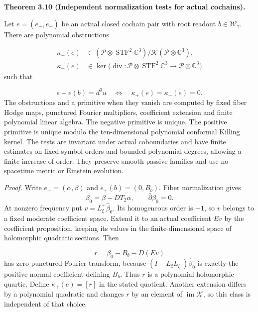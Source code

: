 \documentclass[
  english,
  11pt,
  reqno]{amsart}
\makeatletter
\newcommand{\pandocstatementheading}[1]{%
  \par\addpenalty{\@beginparpenalty}%
  \addvspace{.5\baselineskip plus .2\baselineskip minus .2\baselineskip}%
  {\normalfont\bfseries #1\par}%
  \nobreak\@afterindenttrue\@afterheading
}
\makeatother
\begin{document}
\pandocstatementheading{\leavevmode{}\label{thm:online-actual-cochain-obstruction-test}Theorem 3.10 (Independent normalization tests for actual cochains).}

Let \(e=(e_+,e_-)\) be an actual closed cochain pair with root readout
\(b\in\mathscr W_\gamma\). There are polynomial obstructions

\label{eq:online-actual-polynomial-obstructions} \[
\begin{aligned}
\kappa_+(e)&\in
(\mathcal P\otimes\operatorname{STF}^2\mathbb C^3)
/\mathcal K(\mathcal P\otimes\mathbb C^3),\\
\kappa_-(e)&\in
\ker\bigl(\operatorname{div}:
\mathcal P\otimes\operatorname{STF}^2\mathbb C^3
\longrightarrow\mathcal P\otimes\mathbb C^3\bigr)
\end{aligned}
\] such that

\label{eq:online-actual-normalization-test} \[
e-e(b)=d^0u
\quad\Longleftrightarrow\quad
\kappa_+(e)=\kappa_-(e)=0.
\] The obstructions and a primitive when they vanish are computed by
fixed fiber Hodge maps, punctured Fourier multipliers, coefficient
extension and finite polynomial linear algebra. The negative primitive
is unique. The positive primitive is unique modulo the ten-dimensional
polynomial conformal Killing kernel. The tests are invariant under
actual coboundaries and have finite estimates on fixed symbol orders and
bounded polynomial degrees, allowing a finite increase of order. They
preserve smooth passive families and use no spacetime metric or Einstein
evolution.

\emph{Proof.} Write \(e_+=(\alpha,\beta)\) and \(e_+(b)=(0,B_b)\). Fiber
normalization gives \[
\beta_0=\beta-DT_2\alpha,
\qquad \bar\partial\beta_0=0.
\] At nonzero frequency put \(v=L_\xi^+\widehat\beta_0\). Its
homogeneous order is \(-1\), so \(v\) belongs to a fixed moderate
coefficient space. Extend it to an actual coefficient \(Ev\) by the
coefficient proposition, keeping its values in the finite-dimensional
space of holomorphic quadratic sections. Then

\label{eq:online-positive-polynomial-residual} \[
r=\beta_0-B_b-D(Ev)
\] has zero punctured Fourier transform, because
\((I-L_\xi L_\xi^+)\widehat\beta_0\) is exactly the positive normal
coefficient defining \(B_b\). Thus \(r\) is a polynomial holomorphic
quartic. Define \(\kappa_+(e)=[r]\) in the stated quotient. Another
extension differs by a polynomial quadratic and changes \(r\) by an
element of \(\operatorname{im}\mathcal K\), so this class is independent
of that choice.
\end{document}
